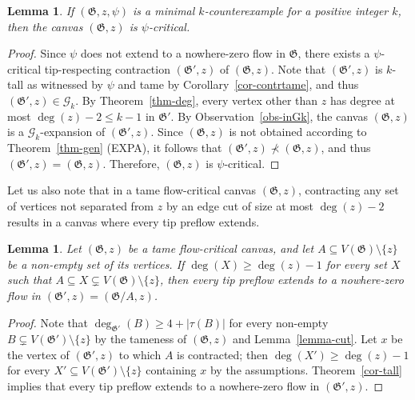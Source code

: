 \documentclass{article}
\newcommand{\GG}{\mathcal{G}}
\newcommand\g{\mathfrak{G}}
\newtheorem{lemma}[theorem]{Lemma}
\begin{document}
\begin{lemma}\label{lemma-gen-psi}
If $(\g,z,\psi)$ is a minimal $k$-counterexample for a positive integer $k$, then the canvas $(\g,z)$ is $\psi$-critical.
\end{lemma}
\begin{proof}
Since $\psi$ does not extend to a nowhere-zero flow in $\g$, there exists a $\psi$-critical tip-respecting contraction $(\g',z)$ of $(\g,z)$.
Note that $(\g',z)$ is $k$-tall as witnessed by $\psi$ and tame by Corollary~\ref{cor-contrtame}, and thus $(\g',z)\in\GG_k$.
By Theorem~\ref{thm-deg}, every vertex other than $z$ has degree at most $\deg(z)-2\le k-1$ in $\g'$.  
By Observation~\ref{obs-inGk}, the canvas $(\g,z)$ is a $\GG_k$-expansion of $(\g',z)$.  Since $(\g,z)$ is not obtained
according to Theorem~\ref{thm-gen} (EXPA), it follows that $(\g',z)\not\prec (\g,z)$, and thus $(\g',z)=(\g,z)$.  Therefore, $(\g,z)$ is $\psi$-critical.
\end{proof}

Let us also note that in a tame flow-critical canvas $(\g,z)$, contracting any set of vertices not separated from $z$ by
an edge cut of size at most $\deg(z)-2$ results in a canvas where every tip preflow extends.

\begin{lemma}\label{lemma-Gk-contr}
Let $(\g,z)$ be a tame flow-critical canvas, and let $A\subseteq V(\g)\setminus \{z\}$ be a non-empty set of its vertices.
If $\deg(X) \ge\deg(z)-1$ for every set $X$ such that $A\subseteq X\subsetneq V(\g)\setminus \{z\}$,
then every tip preflow extends to a nowhere-zero flow in $(\g',z)=(\g / A,z)$. 
\end{lemma}
\begin{proof}
Note that $\deg_{\g'}(B)\ge 4+|\tau(B)|$ for every non-empty $B\subsetneq V(\g')\setminus\{z\}$
by the tameness of $(\g,z)$ and Lemma~\ref{lemma-cut}.
Let $x$ be the vertex of $(\g',z)$ to which $A$ is contracted;
then $\deg(X')\ge \deg(z)-1$ for every $X'\subseteq V(\g')\setminus\{z\}$
containing $x$ by the assumptions.  Theorem~\ref{cor-tall} implies that
every tip preflow extends to a nowhere-zero flow in $(\g',z)$.
\end{proof}
\end{document}
